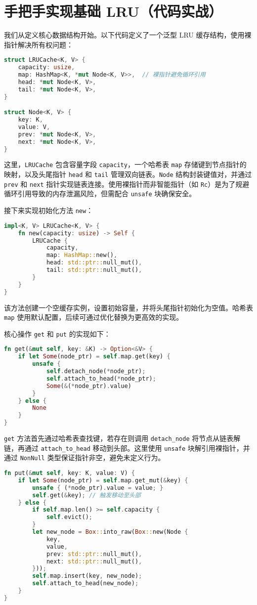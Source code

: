 \chapter{手把手实现基础 LRU（代码实战）}
我们从定义核心数据结构开始。以下代码定义了一个泛型 LRU 缓存结构，使用裸指针解决所有权问题：\par
\begin{lstlisting}[language=rust]
struct LRUCache<K, V> {
    capacity: usize,
    map: HashMap<K, *mut Node<K, V>>,  // 裸指针避免循环引用
    head: *mut Node<K, V>,
    tail: *mut Node<K, V>,
}

struct Node<K, V> {
    key: K,
    value: V,
    prev: *mut Node<K, V>,
    next: *mut Node<K, V>,
}
\end{lstlisting}
这里，\texttt{LRUCache} 包含容量字段 \texttt{capacity}，一个哈希表 \texttt{map} 存储键到节点指针的映射，以及头尾指针 \texttt{head} 和 \texttt{tail} 管理双向链表。\texttt{Node} 结构封装键值对，并通过 \texttt{prev} 和 \texttt{next} 指针实现链表连接。使用裸指针而非智能指针（如 \texttt{Rc}）是为了规避循环引用导致的内存泄漏风险，但需配合 \texttt{unsafe} 块确保安全。\par
接下来实现初始化方法 \texttt{new}：\par
\begin{lstlisting}[language=rust]
impl<K, V> LRUCache<K, V> {
    fn new(capacity: usize) -> Self {
        LRUCache {
            capacity,
            map: HashMap::new(),
            head: std::ptr::null_mut(),
            tail: std::ptr::null_mut(),
        }
    }
}
\end{lstlisting}
该方法创建一个空缓存实例，设置初始容量，并将头尾指针初始化为空值。哈希表 \texttt{map} 使用默认配置，后续可通过优化替换为更高效的实现。\par
核心操作 \texttt{get} 和 \texttt{put} 的实现如下：\par
\begin{lstlisting}[language=rust]
fn get(&mut self, key: &K) -> Option<&V> {
    if let Some(node_ptr) = self.map.get(key) {
        unsafe {
            self.detach_node(*node_ptr);
            self.attach_to_head(*node_ptr);
            Some(&(*node_ptr).value)
        }
    } else {
        None
    }
}
\end{lstlisting}
\texttt{get} 方法首先通过哈希表查找键，若存在则调用 \texttt{detach\_{}node} 将节点从链表解链，再通过 \texttt{attach\_{}to\_{}head} 移动到头部。这里使用 \texttt{unsafe} 块解引用裸指针，并通过 \texttt{NonNull} 类型保证指针非空，避免未定义行为。\par
\begin{lstlisting}[language=rust]
fn put(&mut self, key: K, value: V) {
    if let Some(node_ptr) = self.map.get_mut(&key) {
        unsafe { (*node_ptr).value = value; }
        self.get(&key); // 触发移动至头部
    } else {
        if self.map.len() >= self.capacity {
            self.evict();
        }
        let new_node = Box::into_raw(Box::new(Node {
            key,
            value,
            prev: std::ptr::null_mut(),
            next: std::ptr::null_mut(),
        }));
        self.map.insert(key, new_node);
        self.attach_to_head(new_node);
    }
}
\end{lstlisting}
